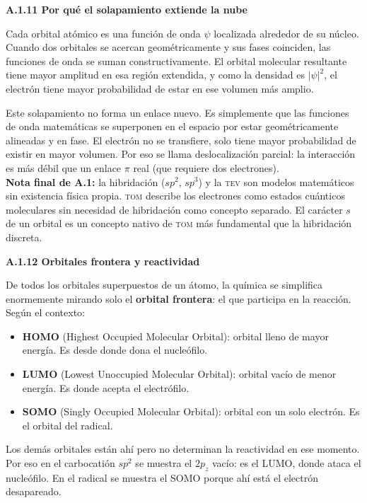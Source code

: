 \label{sec:anexo:tom:solapamiento}
\textbf{A.1.11 Por qué el solapamiento extiende la nube}

Cada orbital atómico es una función de onda $\psi$ localizada alrededor de su núcleo. Cuando dos
orbitales se acercan geométricamente y sus fases coinciden, las funciones de onda se suman
constructivamente. El orbital molecular resultante tiene mayor amplitud en esa región extendida,
y como la densidad es $|\psi|^2$, el electrón tiene mayor probabilidad de estar en ese volumen
más amplio.

Este solapamiento no forma un enlace nuevo. Es simplemente que las funciones de onda matemáticas
se superponen en el espacio por estar geométricamente alineadas y en fase. El electrón no se
transfiere, solo tiene mayor probabilidad de existir en mayor volumen. Por eso se llama
deslocalización parcial: la interacción es más débil que un enlace $\pi$ real (que requiere dos
electrones). \\

\textbf{Nota final de A.1:} la hibridación ($sp^2$, $sp^3$) y la \textsc{tev} son modelos
matemáticos sin existencia física propia. \textsc{tom} describe los electrones como estados
cuánticos moleculares sin necesidad de hibridación como concepto separado. El carácter $s$ de
un orbital es un concepto nativo de \textsc{tom} más fundamental que la hibridación discreta.

\label{sec:anexo:tom:frontera}
\textbf{A.1.12 Orbitales frontera y reactividad}

De todos los orbitales superpuestos de un átomo, la química se simplifica 
enormemente mirando solo el \textbf{orbital frontera}: el que participa 
en la reacción. Según el contexto:
\begin{itemize}
\item \textbf{HOMO} (Highest Occupied Molecular Orbital): orbital lleno 
de mayor energía. Es desde donde dona el nucleófilo.
\item \textbf{LUMO} (Lowest Unoccupied Molecular Orbital): orbital vacío 
de menor energía. Es donde acepta el electrófilo.
\item \textbf{SOMO} (Singly Occupied Molecular Orbital): orbital con un 
solo electrón. Es el orbital del radical.
\end{itemize}

Los demás orbitales están ahí pero no determinan la reactividad en ese 
momento. Por eso en el carbocatión $sp^2$ se muestra el $2p_z$ vacío: 
es el LUMO, donde ataca el nucleófilo. En el radical se muestra el SOMO 
porque ahí está el electrón desapareado.

